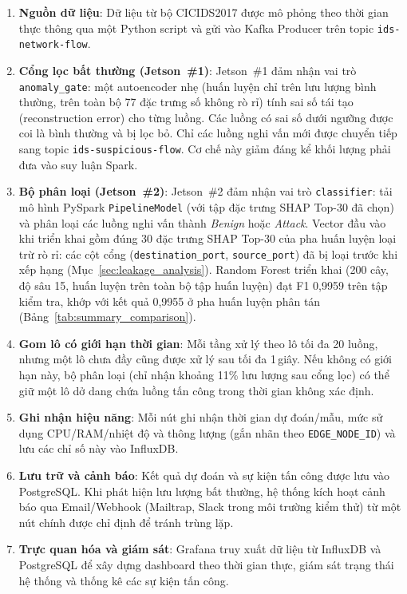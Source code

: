 \pagebreak
\begin{enumerate}

    \item \textbf{Nguồn dữ liệu}:
    Dữ liệu từ bộ CICIDS2017 được mô phỏng theo thời gian thực thông qua một Python script và gửi vào Kafka Producer trên topic \texttt{ids-network-flow}.

    \item \textbf{Cổng lọc bất thường (Jetson~\#1)}:
    Jetson~\#1 đảm nhận vai trò \texttt{anomaly\_gate}: một autoencoder nhẹ (huấn luyện chỉ trên lưu lượng bình thường, trên toàn bộ 77 đặc trưng số không rò rỉ) tính sai số tái tạo (reconstruction error) cho từng luồng. Các luồng có sai số dưới ngưỡng được coi là bình thường và bị lọc bỏ. Chỉ các luồng nghi vấn mới được chuyển tiếp sang topic \texttt{ids-suspicious-flow}. Cơ chế này giảm đáng kể khối lượng phải đưa vào suy luận Spark.

    \item \textbf{Bộ phân loại (Jetson~\#2)}:
    Jetson~\#2 đảm nhận vai trò \texttt{classifier}: tải mô hình PySpark \texttt{PipelineModel} (với tập đặc trưng SHAP Top-30 đã chọn) và phân loại các luồng nghi vấn thành \textit{Benign} hoặc \textit{Attack}. Vector đầu vào khi triển khai gồm đúng 30 đặc trưng SHAP Top-30 của pha huấn luyện loại trừ rò rỉ: các cột cổng (\texttt{destination\_port}, \texttt{source\_port}) đã bị loại trước khi xếp hạng (Mục~\ref{sec:leakage_analysis}). Random Forest triển khai (200 cây, độ sâu 15, huấn luyện trên toàn bộ tập huấn luyện) đạt F1 0{,}9959 trên tập kiểm tra, khớp với kết quả 0{,}9955 ở pha huấn luyện phân tán (Bảng~\ref{tab:summary_comparison}).

    \item \textbf{Gom lô có giới hạn thời gian}:
    Mỗi tầng xử lý theo lô tối đa 20 luồng, nhưng một lô chưa đầy cũng được xử lý sau tối đa 1\,giây. Nếu không có giới hạn này, bộ phân loại (chỉ nhận khoảng 11\% lưu lượng sau cổng lọc) có thể giữ một lô dở dang chứa luồng tấn công trong thời gian không xác định.

    \item \textbf{Ghi nhận hiệu năng}:
    Mỗi nút ghi nhận thời gian dự đoán/mẫu, mức sử dụng CPU/RAM/nhiệt độ và thông lượng (gắn nhãn theo \texttt{EDGE\_NODE\_ID}) và lưu các chỉ số này vào InfluxDB.

    \item \textbf{Lưu trữ và cảnh báo}:
    Kết quả dự đoán và sự kiện tấn công được lưu vào PostgreSQL. Khi phát hiện lưu lượng bất thường, hệ thống kích hoạt cảnh báo qua Email/\allowbreak Webhook (Mailtrap, Slack trong môi trường kiểm thử) từ một nút chính được chỉ định để tránh trùng lặp.

    \item \textbf{Trực quan hóa và giám sát}:
    Grafana truy xuất dữ liệu từ InfluxDB và PostgreSQL để xây dựng dashboard theo thời gian thực, giám sát trạng thái hệ thống và thống kê các sự kiện tấn công.

\end{enumerate}

